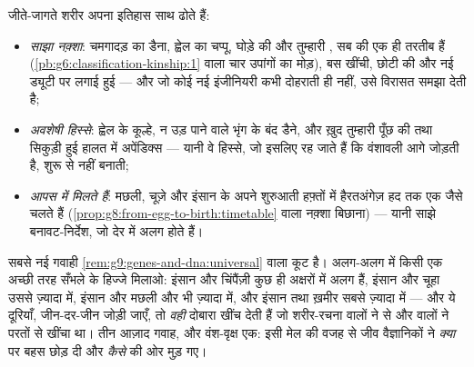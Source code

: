 \begin{proposition}\label{prop:g9:evidence-of-evolution:anatomy}
जीते-जागते शरीर अपना इतिहास साथ ढोते हैं:
\begin{itemize}
  \item \emph{साझा नक़्शा}: चमगादड़ का डैना, ह्वेल का चप्पू, घोड़े की
         और तुम्हारी , सब  की एक ही तरतीब हैं
        (\cref{pb:g6:classification-kinship:1} वाला चार उपांगों का
        मोड़), बस खींची, छोटी की और नई ड्यूटी पर लगाई हुई --- और जो कोई
        नई इंजीनियरी कभी दोहराती ही नहीं, उसे विरासत समझा देती है;
  \item \emph{अवशेषी हिस्से}: ह्वेल के कूल्हे, न उड़ पाने वाले भृंग के
        बंद डैने, और ख़ुद तुम्हारी पूँछ की  तथा सिकुड़ी हुई हालत
        में अपेंडिक्स --- यानी वे हिस्से, जो इसलिए रह जाते हैं कि
        वंशावली आगे जोड़ती है, शुरू से नहीं बनाती;
  \item \emph{ आपस में मिलते हैं}: मछली, चूज़े और इंसान के 
         अपने शुरुआती हफ़्तों में हैरतअंगेज़ हद तक एक जैसे चलते हैं
        (\cref{prop:g8:from-egg-to-birth:timetable} वाला नक़्शा
        बिछाना) --- यानी साझे बनावट-निर्देश, जो देर में अलग होते हैं।
\end{itemize}
\end{proposition}
\admitted

\begin{proposition}[अणु वोट देते हैं]\label{prop:g9:evidence-of-evolution:molecules}
सबसे नई गवाही \cref{rem:g9:genes-and-dna:universal} वाला कूट है।
अलग-अलग  में किसी एक अच्छी तरह सँभले  के हिज्जे मिलाओ: इंसान
और चिंपैंज़ी कुछ ही अक्षरों में अलग हैं, इंसान और चूहा उससे ज़्यादा में,
इंसान और मछली और भी ज़्यादा में, और इंसान तथा ख़मीर सबसे ज़्यादा में ---
और ये दूरियाँ, जीन-दर-जीन जोड़ी जाएँ, तो \emph{वही } दोबारा खींच
देती हैं जो शरीर-रचना वालों ने  से और  वालों ने परतों से
खींचा था। तीन आज़ाद गवाह, और वंश-वृक्ष एक: इसी मेल की वजह से जीव
वैज्ञानिकों ने \emph{क्या} पर बहस छोड़ दी और \emph{कैसे} की ओर मुड़ गए।
\end{proposition}
\admitted

